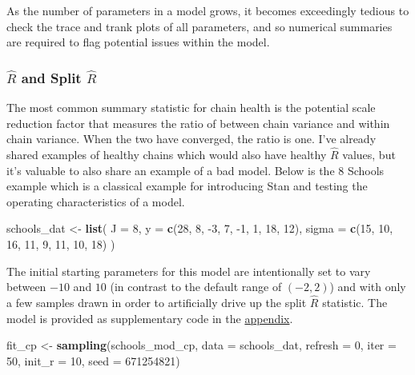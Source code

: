 \documentclass[11pt, oneside, openany]{scrbook}
\newenvironment{Shaded}{\begin{snugshade}}{\end{snugshade}}
\newcommand{\DataTypeTok}[1]{\textcolor[rgb]{0.13,0.29,0.53}{#1}}
\newcommand{\DecValTok}[1]{\textcolor[rgb]{0.00,0.00,0.81}{#1}}
\newcommand{\KeywordTok}[1]{\textcolor[rgb]{0.13,0.29,0.53}{\textbf{#1}}}
\newcommand{\NormalTok}[1]{#1}
\newcommand{\StringTok}[1]{\textcolor[rgb]{0.31,0.60,0.02}{#1}}
\begin{document}
As the number of parameters in a model grows, it becomes exceedingly tedious to check the trace and trank plots of all parameters, and so numerical summaries are required to flag potential issues within the model.

\hypertarget{split-r}{%
\subsubsection{\texorpdfstring{\(\hat{R}\) and Split \(\hat{R}\)}{\textbackslash hat\{R\} and Split \textbackslash hat\{R\}}}\label{split-r}}

The most common summary statistic for chain health is the potential scale reduction factor \citep{gelman1992inference} that measures the ratio of between chain variance and within chain variance. When the two have converged, the ratio is one. I've already shared examples of healthy chains which would also have healthy \(\hat{R}\) values, but it's valuable to also share an example of a bad model. Below is the 8 Schools example \citep{gelman2013bayesian} which is a classical example for introducing Stan and testing the operating characteristics of a model.

\begin{Shaded}
\begin{Highlighting}[]
\NormalTok{schools_dat <-}\StringTok{ }\KeywordTok{list}\NormalTok{(}
  \DataTypeTok{J =} \DecValTok{8}\NormalTok{,}
  \DataTypeTok{y =} \KeywordTok{c}\NormalTok{(}\DecValTok{28}\NormalTok{,  }\DecValTok{8}\NormalTok{, }\DecValTok{-3}\NormalTok{,  }\DecValTok{7}\NormalTok{, }\DecValTok{-1}\NormalTok{,  }\DecValTok{1}\NormalTok{, }\DecValTok{18}\NormalTok{, }\DecValTok{12}\NormalTok{),}
  \DataTypeTok{sigma =} \KeywordTok{c}\NormalTok{(}\DecValTok{15}\NormalTok{, }\DecValTok{10}\NormalTok{, }\DecValTok{16}\NormalTok{, }\DecValTok{11}\NormalTok{,  }\DecValTok{9}\NormalTok{, }\DecValTok{11}\NormalTok{, }\DecValTok{10}\NormalTok{, }\DecValTok{18}\NormalTok{)}
\NormalTok{)}
\end{Highlighting}
\end{Shaded}

The initial starting parameters for this model are intentionally set to vary between \(-10\) and \(10\) (in contrast to the default range of \((-2, 2)\)) and with only a few samples drawn in order to artificially drive up the split \(\hat{R}\) statistic. The model is provided as supplementary code in the \protect\hyperlink{supplementary-code}{appendix}.

\begin{Shaded}
\begin{Highlighting}[]
\NormalTok{fit_cp <-}\StringTok{ }\KeywordTok{sampling}\NormalTok{(schools_mod_cp, }\DataTypeTok{data =}\NormalTok{ schools_dat, }\DataTypeTok{refresh =} \DecValTok{0}\NormalTok{,}
                   \DataTypeTok{iter =} \DecValTok{50}\NormalTok{, }\DataTypeTok{init_r =} \DecValTok{10}\NormalTok{, }\DataTypeTok{seed =} \DecValTok{671254821}\NormalTok{)}
\end{Highlighting}
\end{Shaded}
\end{document}
